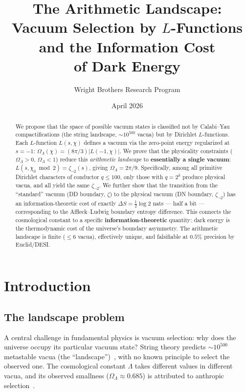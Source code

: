 \documentclass[11pt,a4paper]{article}
\title{The Arithmetic Landscape:\\
Vacuum Selection by $L$-Functions and the Information Cost\\
of Dark Energy}
\author{Wright Brothers Research Program}
\date{April 2026}
\begin{document}
\maketitle

\begin{abstract}
We propose that the space of possible vacuum states is classified
not by Calabi--Yau compactifications (the string landscape,
$\sim 10^{500}$ vacua) but by Dirichlet $L$-functions. Each
$L$-function $L(s, \chi)$ defines a vacuum via the zero-point
energy regularized at $s = -1$:
$\Omega_\Lambda(\chi) = (8\pi/3)|L(-1, \chi)|$.
We prove that the physicality constraints ($\Omega_\Lambda > 0$,
$\Omega_\Lambda < 1$) reduce this \emph{arithmetic landscape} to
\textbf{essentially a single vacuum}: $L(s, \chi_0 \bmod 2) =
\zeta_{\neg 2}(s)$, giving $\Omega_\Lambda = 2\pi/9$. Specifically,
among all primitive Dirichlet characters of conductor $q \leq 100$,
only those with $q = 2^k$ produce physical vacua, and all yield
the same $\zeta_{\neg 2}$. We further show that the transition from
the ``standard'' vacuum (DD boundary, $\zeta$) to the physical
vacuum (DN boundary, $\zeta_{\neg 2}$) has an information-theoretic
cost of exactly $\Delta S = \frac{1}{2}\log 2$ nats --- half a bit
--- corresponding to the Affleck--Ludwig boundary entropy difference.
This connects the cosmological constant to a specific
\textbf{information-theoretic} quantity: dark energy is the
thermodynamic cost of the universe's boundary asymmetry. The
arithmetic landscape is finite ($\leq 6$ vacua), effectively
unique, and falsifiable at $0.5\%$ precision by Euclid/DESI.
\end{abstract}

\section{Introduction}

\subsection{The landscape problem}

A central challenge in fundamental physics is vacuum selection:
why does the universe occupy its particular vacuum state? String
theory predicts $\sim 10^{500}$ metastable vacua (the
``landscape'')~\cite{Susskind2003,KKLT2003}, with no known
principle to select the observed one. The cosmological constant
$\Lambda$ takes different values in different vacua, and its
observed smallness ($\Omega_\Lambda \approx 0.685$) is attributed
to anthropic selection~\cite{Weinberg1987}.
\end{document}
